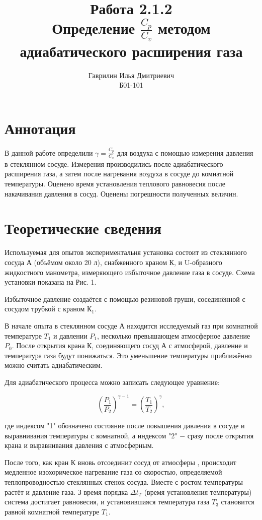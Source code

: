 \documentclass[a4paper, 12pt]{article}%
\author{Гаврилин Илья Дмитриевич \\
	Б01-101}
\title{\textbf{Работа 2.1.2 \\ 
		Определение $\frac{C_{p}}{C_{v}}$ методом адиабатического расширения газа}}
\begin{document}
	\maketitle
	\section{Аннотация}
	В данной работе определили $\gamma = \frac{C_{p}}{C_{v}}$ для воздуха с помощью измерения давления в стеклянном сосуде. Измерения производились после адиабатического расширения газа, а затем после нагревания воздуха в сосуде до комнатной температуры. Оценено время установления теплового равновесия после накачивания давления в сосуд. Оценены погрешности полученных величин.
	\section{Теоретические сведения}
	Используемая для опытов экспериментальня установка состоит из стеклянного сосуда А (объёмом около 20 л), снабженного краном К, и U-образного жидкостного манометра, измеряющего избыточное давление газа в сосуде. Схема установки показана на Рис. 1. 
	
	Избыточное давление создаётся с помощью резиновой груши, сосединённой с сосудом трубкой с краном $К_1$.
	
	В начале опыта  в стеклянном сосуде А находится исследуемый газ при комнатной температуре $T_1$ и давлении $P_1$, несколько превышающем атмосферное давление  $P_0$. После открытия крана К, соединяющего сосуд А с атмосферой, давление и температура газа будут понижаться. Это уменьшение температуры приближённо можно считать адиабатическим. 
	
	Для адиабатического процесса можно записать следующее уравнение: 
	
	\begin{equation}\label{mk}
		\left(\dfrac{P_1}{P_2}\right)^{\gamma - 1} = \left(\dfrac{T_1}{T_2}\right)^\gamma , 
	\end{equation} 
	
	где индексом "1" обозначено состояние после повышения давления в сосуде и выравнивания температуры с комнатной, а индексом "2"  $-$ сразу после открытия крана и выравнивания давления с атмосферным. 
	
	После того, как кран К вновь отсоединит сосуд от атмосферы , происходит медленное изохорическое нагревание газа со скоростью, определяемой теплопроводностью стеклянных стенок сосуда. Вместе с ростом температуры растёт и давление газа. З время порядка $\Delta t_T$  (время установления температуры) система достигает равновесия, и установившаяся температура газа $T_3$ становится равной комнатной температуре $T_1$. 
	
\end{document}
